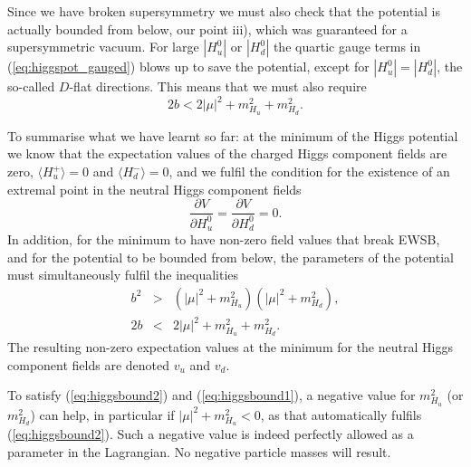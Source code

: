 \documentclass[notes.tex]{subfiles}
\begin{document}
Since we have broken supersymmetry we must also check that the potential is actually bounded from below, our point iii), which was guaranteed for a supersymmetric vacuum. For large $|H_u^0|$ or $|H_d^0|$ the quartic gauge terms in (\ref{eq:higgspot_gauged}) blows up to save the potential, except for $|H^0_u| = |H^0_d|$, the so-called $D$-flat directions. This means that we must also require
\begin{equation}\label{eq:higgsbound1}
2b < 2|\mu|^2 + m_{H_u}^2 + m_{H_d}^2.
\end{equation}

To summarise what we have learnt so far: at the minimum of the Higgs potential we know that the expectation values of the charged Higgs component fields are zero, $\langle H_u^+\rangle =0$ and $\langle H_d^-\rangle =0$, and we fulfil the condition for the existence of an extremal point in the neutral Higgs component fields
\begin{equation}
\frac{\partial V}{\partial H_u^0}=\frac{\partial V}{\partial H_d^0}= 0.
\label{eq:EWSB_condition}
\end{equation}
In addition, for the minimum to have non-zero field values that break EWSB, and for the potential to be bounded from below, the parameters of the potential must simultaneously fulfil the inequalities
\begin{eqnarray}
b^2 &>& (|\mu|^2 + m_{H_u}^2)(|\mu|^2 + m_{H_d}^2), \nonumber\\
2b &<& 2|\mu|^2 + m_{H_u}^2 + m_{H_d}^2. \nonumber
\end{eqnarray}
The resulting non-zero expectation values at the minimum for the neutral Higgs component fields are denoted $v_u$ and $v_d$.

To satisfy (\ref{eq:higgsbound2}) and (\ref{eq:higgsbound1}),  a negative value for $m_{H_u}^2$ (or $m_{H_d}^2$) can help, in particular if $|\mu|^2+m_{H_u}^2<0$, as that automatically fulfils (\ref{eq:higgsbound2}). Such a negative value is indeed perfectly allowed as a parameter in the Lagrangian. No negative particle masses will result. 
\end{document}
